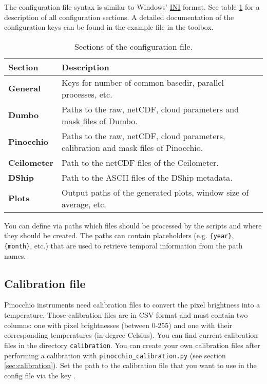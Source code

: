 \documentclass[11pt,a4paper]{article}
\begin{document}
The configuration file syntax is similar to Windows' \href{https://en.wikipedia.org/wiki/INI_file}{INI} format. See table \ref{tab:config-file} for a description of all configuration sections. A detailed documentation of the configuration keys can be found in the example file in the \cloud toolbox.\\

\begin{table}[h!]
	\centering
	\caption{Sections of the configuration file.}
	\label{tab:config-file}
    \begin{tabular}{|l|l|}
    \hline 
    \textbf{Section} & \textbf{Description} \\ 
    \hline \hline 
    \textbf{General} & Keys for number of common basedir, parallel processes, etc. \\ 
    \hline 
    \textbf{Dumbo} & Paths to the raw, netCDF, cloud parameters and mask files of Dumbo. \\ 
    \hline 
    \textbf{Pinocchio} & Paths to the raw, netCDF, cloud parameters, calibration and mask files of Pinocchio. \\ 
    \hline 
    \textbf{Ceilometer} & Path to the netCDF files of the Ceilometer. \\ 
    \hline 
    \textbf{DShip} & Path to the ASCII files of the DShip metadata. \\ 
    \hline 
    \textbf{Plots} & Output paths of the generated plots, window size of average, etc. \\ 
    \hline 
    \end{tabular}
\end{table}

You can define via paths which files should be processed by the scripts and where they should be created. The paths can contain placeholders (e.g. \texttt{\{year\}}, \texttt{\{month\}}, etc.) that are used to retrieve temporal information from the path names.

\subsection{Calibration file}
Pinocchio instruments need calibration files to convert the pixel brightness into a temperature. Those calibration files are in CSV format and must contain two columns: one with pixel brightnesses (between 0-255) and one with their corresponding temperatures (in degree Celsius). You can find current calibration files in the directory \texttt{calibration}. You can create your own calibration files after performing a calibration with \texttt{pinocchio\_calibration.py} (see section \ref{sec:calibration}). Set the path to the calibration file that you want to use in the config file via the key .
\end{document}

